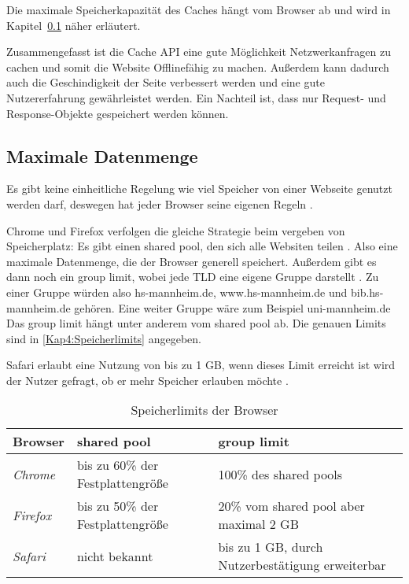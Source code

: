 
Die maximale Speicherkapazität des Caches hängt vom Browser ab und wird in Kapitel~\ref{Kap4:Datenmenge} näher erläutert. 

Zusammengefasst ist die Cache API eine gute Möglichkeit Netzwerkanfragen zu cachen und somit die Website Offlinefähig zu machen. Außerdem kann dadurch auch die Geschindigkeit der Seite verbessert werden und eine gute Nutzererfahrung gewährleistet werden. Ein Nachteil ist, dass nur Request- und Response-Objekte gespeichert werden können. 

\subsection{Maximale Datenmenge}
\label{Kap4:Datenmenge}
Es gibt keine einheitliche Regelung wie viel Speicher von einer Webseite genutzt werden darf, deswegen hat jeder Browser seine eigenen Regeln \autocite{storage-for-the-web}. 

Chrome und Firefox verfolgen die gleiche Strategie beim vergeben von Speicherplatz: Es gibt einen shared pool, den sich alle Websiten teilen \autocite{storage-for-the-web} \autocite{mdn-browser-storage-limit}. Also eine maximale Datenmenge, die der Browser generell speichert. Außerdem gibt es dann noch ein group limit, wobei jede \ac{TLD} eine eigene Gruppe darstellt \autocite{mdn-browser-storage-limit}. Zu einer Gruppe würden also hs-mannheim.de, www.hs-mannheim.de und bib.hs-mannheim.de gehören. Eine weiter Gruppe wäre zum Beispiel uni-mannheim.de Das group limit hängt unter anderem vom shared pool ab. Die genauen Limits sind in \autoref{Kap4:Speicherlimits} angegeben.

Safari erlaubt eine Nutzung von bis zu 1 \ac{GB}, wenn dieses Limit erreicht ist wird der Nutzer gefragt, ob er mehr Speicher erlauben möchte \autocite{storage-for-the-web}. 

\begin{table}
\caption{Speicherlimits der Browser}
  \label{Kap4:Speicherlimits}
  \renewcommand{\arraystretch}{1.2}
  \centering
  \sffamily
  \begin{footnotesize}
    \begin{tabular}{l l l}
      \toprule
      \textbf{Browser} & \textbf{shared pool} & \textbf{group limit} \\
      \midrule
      \emph{Chrome} & bis zu 60\% der Festplattengröße & 100\% des shared pools \\
      \emph{Firefox} & bis zu 50\% der Festplattengröße & 20\% vom shared pool aber maximal 2 \ac{GB} \\
      \emph{Safari} & nicht bekannt & bis zu 1 \ac{GB}, durch Nutzerbestätigung erweiterbar \\
      \bottomrule
    \end{tabular}
  \end{footnotesize}
  \rmfamily
\end{table}

